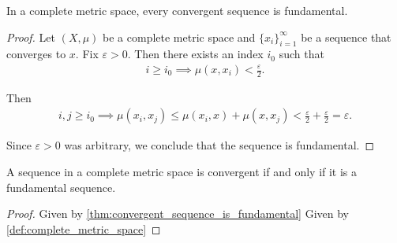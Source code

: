\begin{proposition}\label{thm:convergent_sequence_is_fundamental}
  In a complete metric space, every convergent sequence is fundamental.
\end{proposition}
\begin{proof}
  Let $(X, \mu)$ be a complete metric space and $\{ x_i \}_{i=1}^\infty$ be a sequence that converges to $x$. Fix $\varepsilon > 0$. Then there exists an index $i_0$ such that
  \begin{align*}
    i \geq i_0 \implies \mu(x, x_i) < \tfrac \varepsilon 2.
  \end{align*}

  Then
  \begin{align*}
    i, j \geq i_0 \implies \mu(x_i, x_j) \leq \mu(x_i, x) + \mu(x, x_j) < \tfrac \varepsilon 2 + \tfrac \varepsilon 2 = \varepsilon.
  \end{align*}

  Since $\varepsilon > 0$ was arbitrary, we conclude that the sequence is fundamental.
\end{proof}

\begin{corollary}\label{thm:cauchy_convergence_criterion}
  A sequence in a complete metric space is convergent if and only if it is a fundamental sequence.
\end{corollary}
\begin{proof}
  \Implies Given by \cref{thm:convergent_sequence_is_fundamental}
  \ImpliedBy Given by \cref{def:complete_metric_space}
\end{proof}

